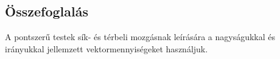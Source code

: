 \documentclass[../fizika.tex]{subfiles}
\begin{document}
    
    \subsection{Összefoglalás}

        \begin{multicols}{2}
            A pontszerű testek sík- és térbeli mozgásnak leírására a nagyságukkal és irányukkal jellemzett vektormennyiségeket használjuk. 
        \end{multicols}
        
\end{document}
